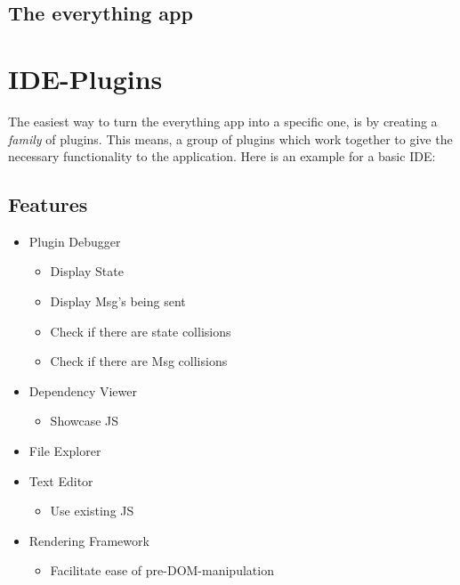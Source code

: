 \documentclass[runningheads]{llncs}
\begin{document}
\subsection{The everything app}
\section {IDE-Plugins}
The easiest way to turn the everything app into a specific one, is by creating a
\textit{family} of plugins. This means, a group of plugins which work together
to give the necessary functionality to the application. Here is an example for a
basic IDE: %

\subsection{Features}

\begin{itemize}
  \item Plugin Debugger
  \begin{itemize}
    \item Display State
    \item Display Msg's being sent
    \item Check if there are state collisions
    \item Check if there are Msg collisions
  \end{itemize}
  \item Dependency Viewer
  \begin{itemize}
    \item Showcase JS
  \end{itemize}
  \item File Explorer
  \item Text Editor
  \begin{itemize}
    \item Use existing JS
  \end{itemize}
  \item Rendering Framework
  \begin{itemize}
    \item Facilitate ease of pre-DOM-manipulation
  \end{itemize}
\end{itemize}
\end{document}

